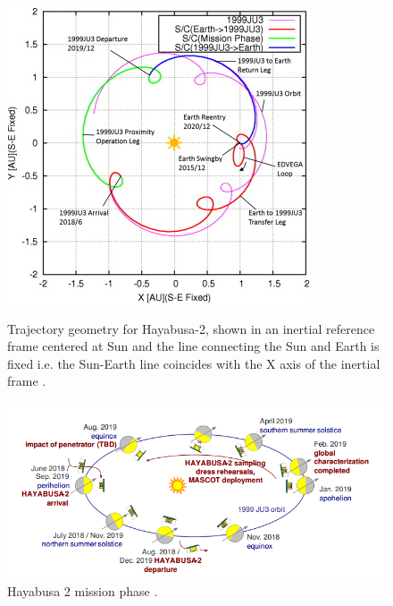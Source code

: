 \begin{figure}[h]
\begin{minipage}[t]{0.45\linewidth}
\centering
\includegraphics[width=\textwidth]{hayabusa2lowthrust.jpg}
\caption{Trajectory geometry for Hayabusa-2, shown in an inertial reference frame centered at Sun and the line connecting the Sun and Earth is fixed i.e. the Sun-Earth line coincides with the X axis of the inertial frame \cite{ju3lowthrust}.}
\label{fig:hayabusa2transfer}
\end{minipage}
\hspace{0.5cm}
\begin{minipage}[t]{0.45\linewidth}
\centering
\includegraphics[scale=0.5]{aroundju3traj.png}
\caption{Hayabusa 2 mission phase \cite{ju3traj}.}
\label{fig:aroundju3}
\end{minipage}
\end{figure}


